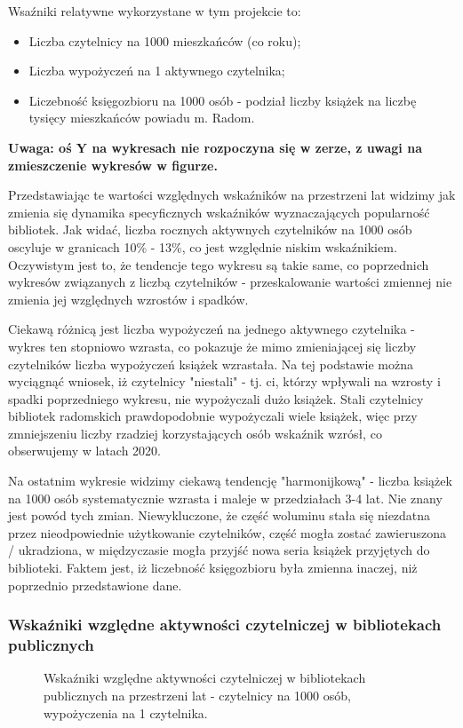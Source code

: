 \documentclass[12pt]{article}
\begin{document}
Wsaźniki relatywne wykorzystane w tym projekcie to:
\begin{itemize}
    \item Liczba czytelnicy na 1000 mieszkańców (co roku);
    \item Liczba wypożyczeń na 1 aktywnego czytelnika;
    \item Liczebność księgozbioru na 1000 osób - podział liczby książek na liczbę tysięcy mieszkańców powiadu m. Radom.
\end{itemize}

\textbf{Uwaga: oś Y na wykresach nie rozpoczyna się w zerze, z uwagi na zmieszczenie wykresów w figurze.}

Przedstawiając te wartości względnych wskaźników na przestrzeni lat widzimy jak zmienia się dynamika specyficznych wskaźników 
wyznaczających popularność bibliotek. Jak widać, liczba rocznych aktywnych czytelników na 1000 osób oscyluje w granicach 10\% - 13\%, 
co jest względnie niskim wskaźnikiem. Oczywistym jest to, że tendencje tego wykresu są takie same, co poprzednich wykresów związanych z liczbą czytelników - 
przeskalowanie wartości zmiennej nie zmienia jej względnych wzrostów i spadków.

Ciekawą różnicą jest liczba wypożyczeń na jednego aktywnego czytelnika - wykres ten stopniowo wzrasta, co pokazuje że mimo zmieniającej się liczby czytelników
liczba wypożyczeń książek wzrastała. Na tej podstawie można wyciągnąć wniosek, iż czytelnicy "niestali" - tj. ci, którzy wpływali na wzrosty i spadki 
poprzedniego wykresu, nie wypożyczali dużo książek. Stali czytelnicy bibliotek radomskich prawdopodobnie wypożyczali wiele książek, więc przy zmniejszeniu
liczby rzadziej korzystających osób wskaźnik wzrósł, co obserwujemy w latach 2020.

Na ostatnim wykresie widzimy ciekawą tendencję "harmonijkową" - liczba książek na 1000 osób systematycznie wzrasta i maleje w przedziałach 3-4 lat. 
Nie znany jest powód tych zmian. Niewykluczone, że część woluminu stała się niezdatna przez nieodpowiednie użytkowanie czytelników, 
część mogła zostać zawieruszona / ukradziona, w międzyczasie mogła przyjść nowa seria książek przyjętych do biblioteki. Faktem jest, iż liczebność 
księgozbioru była zmienna inaczej, niż poprzednio przedstawione dane.

\subsubsection{Wskaźniki względne aktywności czytelniczej w bibliotekach publicznych}
\begin{figure}[H]
    
    \caption{Wskaźniki względne aktywności czytelniczej w bibliotekach publicznych na przestrzeni lat
     - czytelnicy na 1000 osób, wypożyczenia na 1 czytelnika.}
\end{figure}
\end{document}
